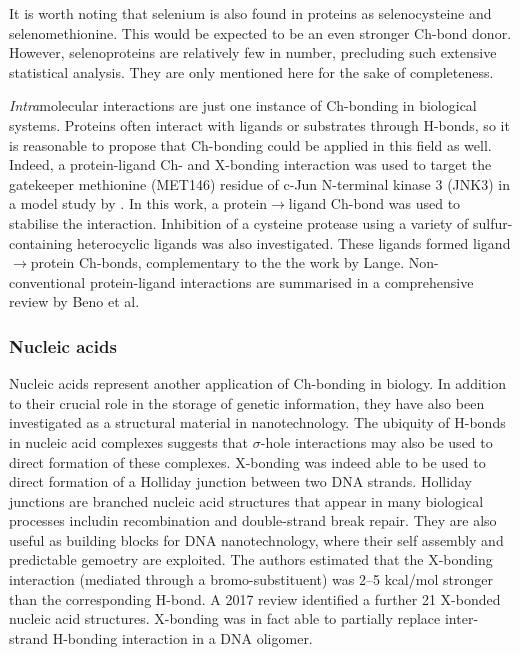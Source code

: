 \begin{refsection}
It is worth noting that selenium is also found in proteins as selenocysteine and selenomethionine.
This would be expected to be an even stronger Ch-bond donor.
However, selenoproteins are relatively few in number, precluding such extensive statistical analysis.\autocite{Iwaoka2015}
They are only mentioned here for the sake of completeness.

\emph{Intra}molecular interactions are just one instance of Ch-bonding in biological systems.
Proteins often interact with ligands or substrates through H-bonds, so it is reasonable to propose that Ch-bonding could be applied in this field as well.
Indeed, a protein-ligand Ch- and X-bonding interaction was used to target the gatekeeper methionine (MET146) residue of c-Jun N-terminal kinase 3 (JNK3) in a model study by \citeauthor{Lange2015}.\autocite{Lange2015}
In this work, a protein$\rightarrow$ligand Ch-bond was used to stabilise the interaction.
Inhibition of a cysteine protease using a variety of sulfur-containing heterocyclic ligands was also investigated.\autocite{Giroud2017}
These ligands formed ligand$\rightarrow$protein Ch-bonds, complementary to the the work by Lange.
Non-conventional protein-ligand interactions are summarised in a comprehensive review by Beno et al.\autocite{Beno2015}

\subsubsection{Nucleic acids}
Nucleic acids represent another application of Ch-bonding in biology.
In addition to their crucial role in the storage of genetic information, they have also been investigated as a structural material in nanotechnology.
The ubiquity of H-bonds in nucleic acid complexes suggests that $\sigma$-hole interactions may also be used to direct formation of these complexes.
X-bonding was indeed able to be used to direct formation of a Holliday junction between two DNA strands.\autocite{Voth2007}
Holliday junctions are branched nucleic acid structures that appear in many biological processes includin recombination and double-strand break repair.
They are also useful as building blocks for DNA nanotechnology, where their self assembly and predictable gemoetry are exploited.
The authors estimated that the X-bonding interaction (mediated through a bromo-substituent) was 2--5 kcal/mol stronger than the corresponding H-bond.
A 2017 review identified a further 21 X-bonded nucleic acid structures.\autocite{Kolar2017}
X-bonding was in fact able to partially replace inter-strand H-bonding interaction in a DNA oligomer.\autocite{Parker2012}


\end{refsection}
